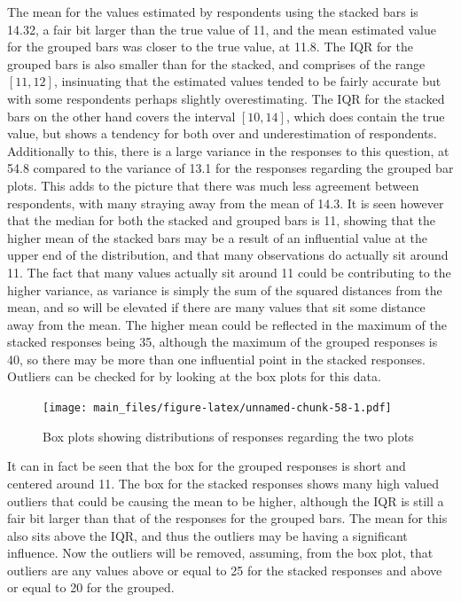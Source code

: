 \documentclass[
  11pt,
]{book}
\begin{document}
The mean for the values estimated by respondents using the stacked bars
is 14.32, a fair bit larger than the true value of 11, and the mean
estimated value for the grouped bars was closer to the true value, at
11.8. The IQR for the grouped bars is also smaller than for the stacked,
and comprises of the range \([11, 12]\), insinuating that the estimated
values tended to be fairly accurate but with some respondents perhaps
slightly overestimating. The IQR for the stacked bars on the other hand
covers the interval \([10, 14]\), which does contain the true value, but
shows a tendency for both over and underestimation of respondents.
Additionally to this, there is a large variance in the responses to this
question, at 54.8 compared to the variance of 13.1 for the responses
regarding the grouped bar plots. This adds to the picture that there was
much less agreement between respondents, with many straying away from
the mean of 14.3. It is seen however that the median for both the
stacked and grouped bars is 11, showing that the higher mean of the
stacked bars may be a result of an influential value at the upper end of
the distribution, and that many observations do actually sit around 11.
The fact that many values actually sit around 11 could be contributing
to the higher variance, as variance is simply the sum of the squared
distances from the mean, and so will be elevated if there are many
values that sit some distance away from the mean. The higher mean could
be reflected in the maximum of the stacked responses being 35, although
the maximum of the grouped responses is 40, so there may be more than
one influential point in the stacked responses. Outliers can be checked
for by looking at the box plots for this data.

\begin{figure}
\centering
\texttt{[image: main\_files/figure-latex/unnamed-chunk-58-1.pdf]}
\caption{Box plots showing distributions of responses regarding the two
plots}
\end{figure}

It can in fact be seen that the box for the grouped responses is short
and centered around 11. The box for the stacked responses shows many
high valued outliers that could be causing the mean to be higher,
although the IQR is still a fair bit larger than that of the responses
for the grouped bars. The mean for this also sits above the IQR, and
thus the outliers may be having a significant influence. Now the
outliers will be removed, assuming, from the box plot, that outliers are
any values above or equal to 25 for the stacked responses and above or
equal to 20 for the grouped.
\end{document}
